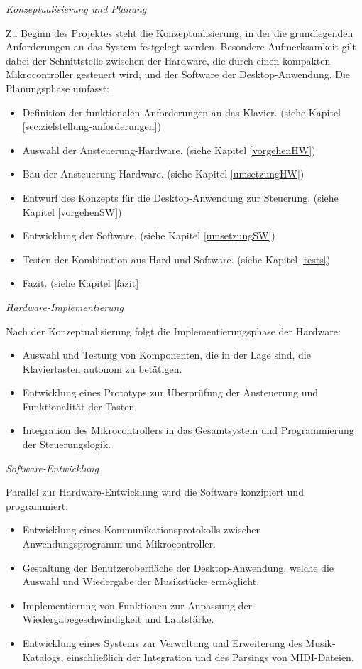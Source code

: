 \textit{Konzeptualisierung und Planung}

Zu Beginn des Projektes steht die Konzeptualisierung, in der die grundlegenden Anforderungen an das System festgelegt werden.
Besondere Aufmerksamkeit gilt dabei der Schnittstelle zwischen der Hardware, die durch einen kompakten Mikrocontroller gesteuert wird,
und der Software der Desktop-Anwendung.
Die Planungsphase umfasst:

\begin{itemize}
    \item Definition der funktionalen Anforderungen an das Klavier. (siehe Kapitel \ref{sec:zielstellung-anforderungen})
    \item Auswahl der Ansteuerung-Hardware. (siehe Kapitel \ref{vorgehenHW})
    \item Bau der Ansteuerung-Hardware. (siehe Kapitel \ref{umsetzungHW})
    \item Entwurf des Konzepts für die Desktop-Anwendung zur Steuerung. (siehe Kapitel \ref{vorgehenSW})
    \item Entwicklung der Software. (siehe Kapitel \ref{umsetzungSW})
    \item Testen der Kombination aus Hard-und Software. (siehe Kapitel \ref{tests})
    \item Fazit. (siehe Kapitel \ref{fazit}
\end{itemize}

\textit{Hardware-Implementierung}

Nach der Konzeptualisierung folgt die Implementierungsphase der Hardware:

\begin{itemize}
    \item Auswahl und Testung von Komponenten, die in der Lage sind, die Klaviertasten autonom zu betätigen.
    \item Entwicklung eines Prototyps zur Überprüfung der Ansteuerung und Funktionalität der Tasten.
    \item Integration des Mikrocontrollers in das Gesamtsystem und Programmierung der Steuerungslogik.
\end{itemize}

\textit{Software-Entwicklung}

Parallel zur Hardware-Entwicklung wird die Software konzipiert und programmiert:

\begin{itemize}
    \item Entwicklung eines Kommunikationsprotokolls zwischen Anwendungsprogramm und Mikrocontroller.
    \item Gestaltung der Benutzeroberfläche der Desktop-Anwendung, welche die Auswahl und Wiedergabe der Musikstücke ermöglicht.
    \item Implementierung von Funktionen zur Anpassung der Wiedergabegeschwindigkeit und Lautstärke.
    \item Entwicklung eines Systems zur Verwaltung und Erweiterung des Musik-Katalogs, einschließlich der Integration und des Parsings von MIDI-Dateien.
\end{itemize}

